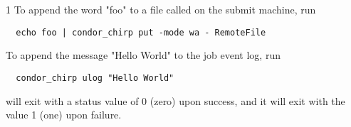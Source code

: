 \begin{ManPage}{\label{man-condor-chirp}}{1}
To append the word "foo" to a file called  
on the submit machine, run

\footnotesize
\begin{verbatim}
  echo foo | condor_chirp put -mode wa - RemoteFile
\end{verbatim}
\normalsize

To append the message "Hello World" to the job event log, run

\footnotesize
\begin{verbatim}
  condor_chirp ulog "Hello World"
\end{verbatim}
\normalsize

\ExitStatus

 will exit with a status value of 0 (zero) upon success,
and it will exit with the value 1 (one) upon failure.

\end{ManPage}
